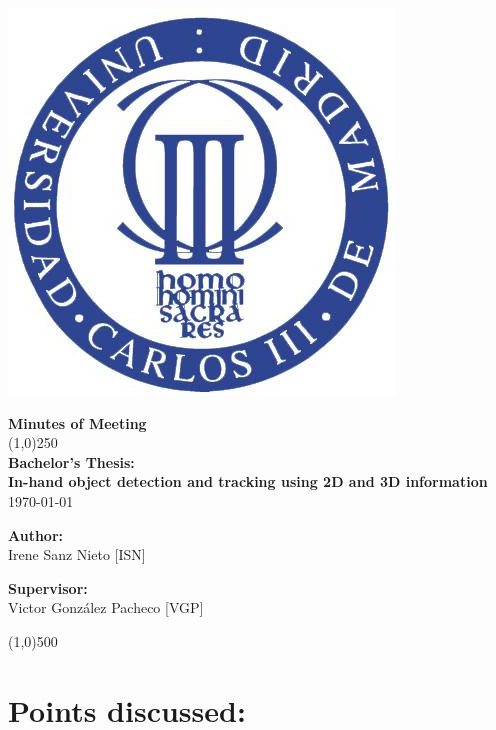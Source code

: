 \documentclass{article}
\newenvironment{myindentpar}[1]%
 {\begin{list}{}%
         {\setlength{\leftmargin}{#1}}%
         \item[]%
 }
 {\end{list}}
\begin{document}
\includegraphics[width=0.1\linewidth]{../template/uc3m.jpg}

\vspace{-1cm}
\begin{minipage}[b]{1\linewidth}
	\begin{center}
	{\Huge \bfseries{Minutes of Meeting}}\\
	\line(1,0){250}\\[0.5scm]
	{\LARGE \textbf{Bachelor's Thesis:\\[0.5cm] In-hand object detection and tracking using 2D and 3D information}}\\[0.5cm]
	{\large \today}
	\end{center}
\end {minipage}



\begin{minipage}{0.55\textwidth}
\begin{flushleft} \large
\textbf{{Author:}\\}
Irene Sanz Nieto [ISN]\\
\end{flushleft}
\end{minipage}
\begin{minipage}{0.4\textwidth}
\begin{flushright} \large
\textbf{Supervisor: }\\
Victor González Pacheco [VGP]
\end{flushright}\end{minipage}

\begin{center}
\line(1,0){500}
\end{center}

\renewcommand{\thesubsection}
{\hspace*{1cm} \arabic{section}.\arabic{subsection}}



\section{\LARGE Points discussed: }
	\subsection{}
		\begin{myindentpar}{1cm} 
		
		\end{myindentpar}
\end{document}
